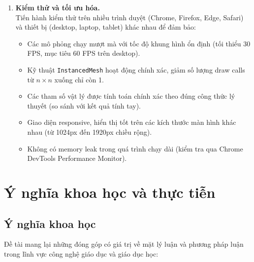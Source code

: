 \begin{enumerate}
    \item \textbf{Kiểm thử và tối ưu hóa.} \\
    Tiến hành kiểm thử trên nhiều trình duyệt (Chrome, Firefox, Edge, Safari) và thiết bị (desktop, laptop, tablet) khác nhau để đảm bảo:
    \begin{itemize}
        \item Các mô phỏng chạy mượt mà với tốc độ khung hình ổn định (tối thiểu 30 FPS, mục tiêu 60 FPS trên desktop).
        \item Kỹ thuật \texttt{InstancedMesh} hoạt động chính xác, giảm số lượng draw calls từ $n \times n$ xuống chỉ còn 1.
        \item Các tham số vật lý được tính toán chính xác theo đúng công thức lý thuyết (so sánh với kết quả tính tay).
        \item Giao diện responsive, hiển thị tốt trên các kích thước màn hình khác nhau (từ 1024px đến 1920px chiều rộng).
        \item Không có memory leak trong quá trình chạy dài (kiểm tra qua Chrome DevTools Performance Monitor).
    \end{itemize}
\end{enumerate}

\section{Ý nghĩa khoa học và thực tiễn}

\subsection{Ý nghĩa khoa học}
Đề tài mang lại những đóng góp có giá trị về mặt lý luận và phương pháp luận trong lĩnh vực công nghệ giáo dục và giáo dục học:

